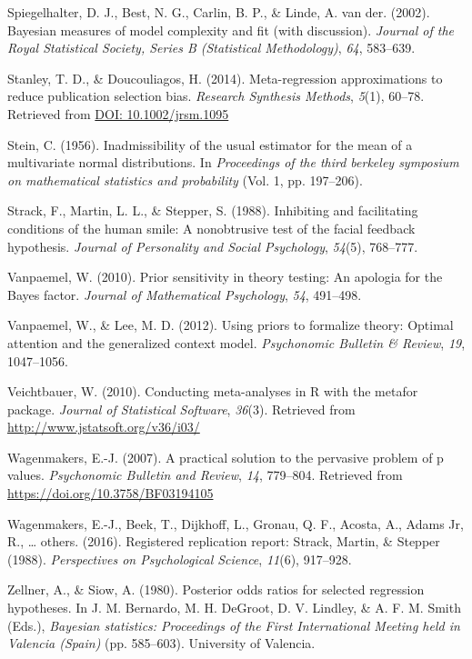 \documentclass[english,man]{apa6}
\theoremstyle{definition}
\theoremstyle{definition}
\theoremstyle{remark}
\begin{document}
\hypertarget{ref-Spiegelhalter:etal:2002}{}
Spiegelhalter, D. J., Best, N. G., Carlin, B. P., \& Linde, A. van der.
(2002). Bayesian measures of model complexity and fit (with discussion).
\emph{Journal of the Royal Statistical Society, Series B (Statistical
Methodology)}, \emph{64}, 583--639.

\hypertarget{ref-Stanley:Doucouliagos:2014}{}
Stanley, T. D., \& Doucouliagos, H. (2014). Meta-regression
approximations to reduce publication selection bias. \emph{Research
Synthesis Methods}, \emph{5}(1), 60--78. Retrieved from
\href{DOI:\%2010.1002/jrsm.1095}{DOI: 10.1002/jrsm.1095}

\hypertarget{ref-Stein:1956}{}
Stein, C. (1956). Inadmissibility of the usual estimator for the mean of
a multivariate normal distributions. In \emph{Proceedings of the third
berkeley symposium on mathematical statistics and probability} (Vol. 1,
pp. 197--206).

\hypertarget{ref-Strack:etal:1988}{}
Strack, F., Martin, L. L., \& Stepper, S. (1988). Inhibiting and
facilitating conditions of the human smile: A nonobtrusive test of the
facial feedback hypothesis. \emph{Journal of Personality and Social
Psychology}, \emph{54}(5), 768--777.

\hypertarget{ref-Vanpaemel:2010}{}
Vanpaemel, W. (2010). Prior sensitivity in theory testing: An apologia
for the Bayes factor. \emph{Journal of Mathematical Psychology},
\emph{54}, 491--498.

\hypertarget{ref-Vanpaemel:Lee:2012}{}
Vanpaemel, W., \& Lee, M. D. (2012). Using priors to formalize theory:
Optimal attention and the generalized context model. \emph{Psychonomic
Bulletin \& Review}, \emph{19}, 1047--1056.

\hypertarget{ref-Veichtbauer:2010}{}
Veichtbauer, W. (2010). Conducting meta-analyses in R with the metafor
package. \emph{Journal of Statistical Software}, \emph{36}(3). Retrieved
from \url{http://www.jstatsoft.org/v36/i03/}

\hypertarget{ref-Wagenmakers:2007}{}
Wagenmakers, E.-J. (2007). A practical solution to the pervasive problem
of p values. \emph{Psychonomic Bulletin and Review}, \emph{14},
779--804. Retrieved from \url{https://doi.org/10.3758/BF03194105}

\hypertarget{ref-Wagenmakers:etal:2016}{}
Wagenmakers, E.-J., Beek, T., Dijkhoff, L., Gronau, Q. F., Acosta, A.,
Adams Jr, R., \ldots{} others. (2016). Registered replication report:
Strack, Martin, \& Stepper (1988). \emph{Perspectives on Psychological
Science}, \emph{11}(6), 917--928.

\hypertarget{ref-Zellner:Siow:1980}{}
Zellner, A., \& Siow, A. (1980). Posterior odds ratios for selected
regression hypotheses. In J. M. Bernardo, M. H. DeGroot, D. V. Lindley,
\& A. F. M. Smith (Eds.), \emph{Bayesian statistics: Proceedings of the
First International Meeting held in Valencia (Spain)} (pp. 585--603).
University of Valencia.
\end{document}
